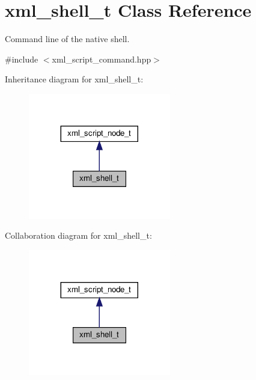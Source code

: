 \hypertarget{classxml__shell__t}{}\section{xml\+\_\+shell\+\_\+t Class Reference}
\label{classxml__shell__t}


Command line of the native shell.  




{\ttfamily \#include $<$xml\+\_\+script\+\_\+command.\+hpp$>$}



Inheritance diagram for xml\+\_\+shell\+\_\+t\+:
\nopagebreak
\begin{figure}[H]
\begin{center}
\leavevmode
\includegraphics[width=176pt]{d8/df6/classxml__shell__t__inherit__graph}
\end{center}
\end{figure}


Collaboration diagram for xml\+\_\+shell\+\_\+t\+:
\nopagebreak
\begin{figure}[H]
\begin{center}
\leavevmode
\includegraphics[width=176pt]{d0/d91/classxml__shell__t__coll__graph}
\end{center}
\end{figure}
